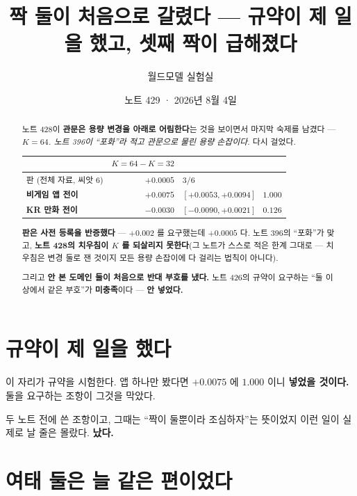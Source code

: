\documentclass[11pt]{article}
\begin{document}
\title{짝 둘이 처음으로 갈렸다 --- 규약이 제 일을 했고, 셋째 짝이 급해졌다}
\author{월드모델 실험실}
\date{노트 429 · 2026년 8월 4일}
\maketitle

\begin{abstract}
노트 428이 \textbf{관문은 용량 변경을 아래로 어림한다}는 것을 보이면서
마지막 숙제를 남겼다 --- \emph{$K{=}64$. 노트 396이 ``포화''라 적고 관문으로
물린 용량 손잡이다.} 다시 걸었다.

\begin{center}
\begin{tabular}{lrl}
\hline
 & $K{=}64 - K{=}32$ & \\
\hline
판 (전체 자료, 씨앗 6) & $+0.0005$ & $3/6$ \\
\textbf{비게임 앱 전이} & $\mathbf{+0.0075}$ & $[+0.0053, +0.0094]$ \ $1.000$ \\
\textbf{KR 만화 전이} & $\mathbf{-0.0030}$ & $[-0.0090, +0.0021]$ \ $0.126$ \\
\hline
\end{tabular}
\end{center}

\textbf{판은 사전 등록을 반증했다} --- $+0.002$ 를 요구했는데 $+0.0005$ 다.
노트 396의 ``포화''가 맞고, \textbf{노트 428의 치우침이 $K$ 를 되살리지
못한다}(그 노트가 스스로 적은 한계 그대로 --- 치우침은 변경 둘로 잰 것이지
모든 용량 손잡이에 다 걸리는 법칙이 아니다).

그리고 \textbf{안 본 도메인 둘이 처음으로 반대 부호를 냈다.} 노트 426의
규약이 요구하는 ``둘 이상에서 같은 부호''가 \textbf{미충족}이다 ---
\textbf{안 넣었다.}
\end{abstract}

\section{규약이 제 일을 했다}

이 자리가 규약을 시험한다. 앱 하나만 봤다면 $+0.0075$ 에 $1.000$ 이니
\textbf{넣었을 것이다.} 둘을 요구하는 조항이 그것을 막았다.

두 노트 전에 쓴 조항이고, 그때는 ``짝이 둘뿐이라 조심하자''는 뜻이었지
이런 일이 실제로 날 줄은 몰랐다. \textbf{났다.}

\section{여태 둘은 늘 같은 편이었다}
\end{document}
